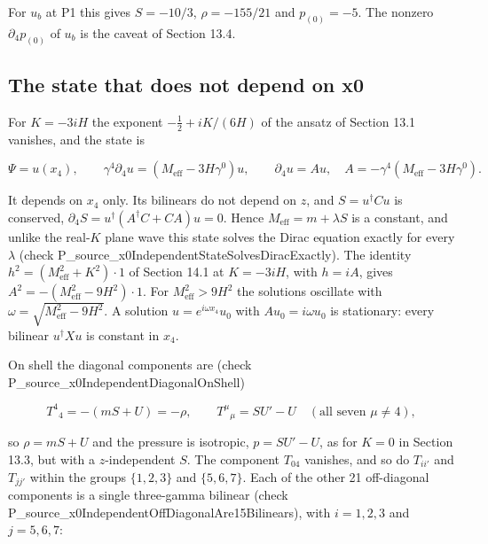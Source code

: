 \documentclass[11pt]{article}
\begin{document}
For $u_b$ at P1 this gives $S=-10/3$, $\rho=-155/21$ and $p_{(0)}=-5$. The nonzero $\partial_4p_{(0)}$ of $u_b$ is the caveat of Section 13.4.

\subsection{The state that does not depend on x0}

For $K=-3iH$ the exponent $-\tfrac12+iK/(6H)$ of the ansatz of Section 13.1 vanishes, and the state is

\[
\Psi=u(x_4),\qquad \gamma^4\partial_4u=(M_{\mathrm{eff}}-3H\gamma^0)u,\qquad \partial_4u=Au,\quad A=-\gamma^4(M_{\mathrm{eff}}-3H\gamma^0).
\]

It depends on $x_4$ only. Its bilinears do not depend on $z$, and $S=u^\dagger Cu$ is conserved, $\partial_4S=u^\dagger(A^\dagger C+CA)u=0$. Hence $M_{\mathrm{eff}}=m+\lambda S$ is a constant, and unlike the real-$K$ plane wave this state solves the Dirac equation exactly for every $\lambda$ (check P\_source\_x0IndependentStateSolvesDiracExactly). The identity $h^2=(M_{\mathrm{eff}}^2+K^2)\cdot1$ of Section 14.1 at $K=-3iH$, with $h=iA$, gives $A^2=-(M_{\mathrm{eff}}^2-9H^2)\cdot1$. For $M_{\mathrm{eff}}^2>9H^2$ the solutions oscillate with $\omega=\sqrt{M_{\mathrm{eff}}^2-9H^2}$. A solution $u=e^{i\omega x_4}u_0$ with $Au_0=i\omega u_0$ is stationary: every bilinear $u^\dagger Xu$ is constant in $x_4$.

On shell the diagonal components are (check P\_source\_x0IndependentDiagonalOnShell)

\[
T^4{}_4=-(mS+U)=-\rho,\qquad T^\mu{}_\mu=SU'-U\quad(\text{all seven }\mu\ne4),
\]

so $\rho=mS+U$ and the pressure is isotropic, $p=SU'-U$, as for $K=0$ in Section 13.3, but with a $z$-independent $S$. The component $T_{04}$ vanishes, and so do $T_{ii'}$ and $T_{jj'}$ within the groups $\{1,2,3\}$ and $\{5,6,7\}$. Each of the other 21 off-diagonal components is a single three-gamma bilinear (check P\_source\_x0IndependentOffDiagonalAre15Bilinears), with $i=1,2,3$ and $j=5,6,7$:
\end{document}
